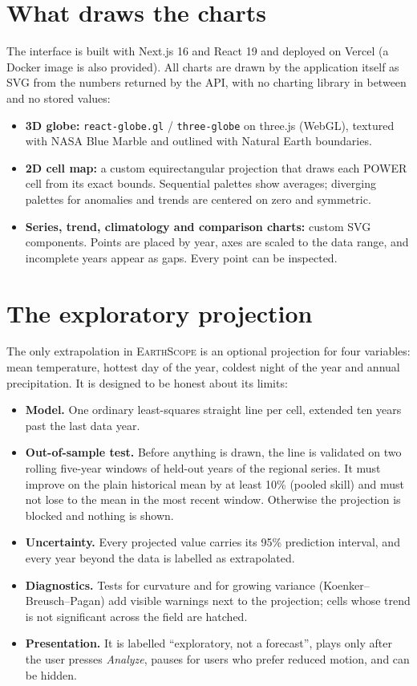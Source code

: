 \documentclass[12pt, oneside, openany]{report}
\newcommand{\EarthScope}{\textsc{EarthScope}}
\begin{document}
\section{What draws the charts}

The interface is built with Next.js 16 and React 19 and deployed on Vercel (a Docker image is also provided). All charts are drawn by the application itself as SVG from the numbers returned by the API, with no charting library in between and no stored values:

\begin{itemize}[leftmargin=*]
    \item \textbf{3D globe:} \texttt{react-globe.gl} / \texttt{three-globe} \cite{threeglobe} on three.js (WebGL), textured with NASA Blue Marble \cite{bluemarble} and outlined with Natural Earth boundaries.
    \item \textbf{2D cell map:} a custom equirectangular projection that draws each POWER cell from its exact bounds. Sequential palettes show averages; diverging palettes for anomalies and trends are centered on zero and symmetric.
    \item \textbf{Series, trend, climatology and comparison charts:} custom SVG components. Points are placed by year, axes are scaled to the data range, and incomplete years appear as gaps. Every point can be inspected.
\end{itemize}

\section{The exploratory projection}

The only extrapolation in \EarthScope{} is an optional projection for four variables: mean temperature, hottest day of the year, coldest night of the year and annual precipitation. It is designed to be honest about its limits:

\begin{itemize}[leftmargin=*]
    \item \textbf{Model.} One ordinary least-squares straight line per cell, extended ten years past the last data year.
    \item \textbf{Out-of-sample test.} Before anything is drawn, the line is validated on two rolling five-year windows of held-out years of the regional series. It must improve on the plain historical mean by at least 10\% (pooled skill) and must not lose to the mean in the most recent window. Otherwise the projection is blocked and nothing is shown.
    \item \textbf{Uncertainty.} Every projected value carries its 95\% prediction interval, and every year beyond the data is labelled as extrapolated.
    \item \textbf{Diagnostics.} Tests for curvature and for growing variance (Koenker--Breusch--Pagan) add visible warnings next to the projection; cells whose trend is not significant across the field are hatched.
    \item \textbf{Presentation.} It is labelled \enquote{exploratory, not a forecast}, plays only after the user presses \emph{Analyze}, pauses for users who prefer reduced motion, and can be hidden.
\end{itemize}
\end{document}
